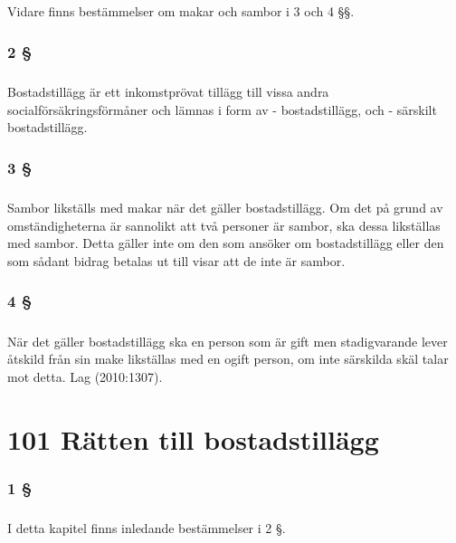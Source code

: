 \documentclass[a4paper,notitlepage,openany,10pt]{book}
\begin{document}
\paragraph*{}
Vidare finns bestämmelser om makar och sambor i 3 och 4 §§.
\subsection*{2 §}
\paragraph*{}
Bostadstillägg är ett inkomstprövat tillägg till vissa andra socialförsäkringsförmåner och lämnas i form av
\newline - bostadstillägg, och
\newline - särskilt bostadstillägg.
\subsection*{3 §}
\paragraph*{}
Sambor likställs med makar när det gäller bostadstillägg.
Om det på grund av omständigheterna är sannolikt att två personer är sambor, ska dessa likställas med sambor. Detta gäller inte om den som ansöker om bostadstillägg eller den som sådant bidrag betalas ut till visar att de inte är sambor.
\subsection*{4 §}
\paragraph*{}
När det gäller bostadstillägg ska en person som är gift men stadigvarande lever åtskild från sin make likställas med en ogift person, om inte särskilda skäl talar mot detta.
Lag (2010:1307).
\chapter*{101 Rätten till bostadstillägg}
\subsection*{1 §}
\paragraph*{}
I detta kapitel finns inledande bestämmelser i 2 §.
\end{document}
